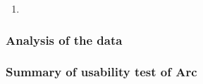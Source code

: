 \begin{enumerate}
    \item
\end{enumerate}

\subsubsection{Analysis of the data}\label{subsubsec:analysisOfTheData}
    

\subsubsection{Summary of usability test of Arc}





